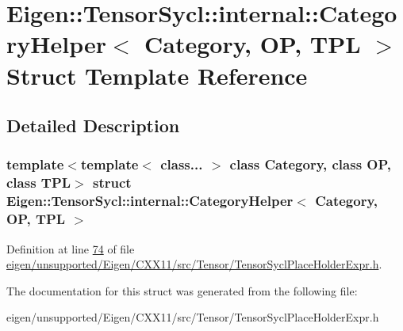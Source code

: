 \hypertarget{struct_eigen_1_1_tensor_sycl_1_1internal_1_1_category_helper}{}\section{Eigen\+:\+:Tensor\+Sycl\+:\+:internal\+:\+:Category\+Helper$<$ Category, OP, T\+PL $>$ Struct Template Reference}
\label{struct_eigen_1_1_tensor_sycl_1_1internal_1_1_category_helper}


\subsection{Detailed Description}
\subsubsection*{template$<$template$<$ class... $>$ class Category, class OP, class T\+PL$>$\newline
struct Eigen\+::\+Tensor\+Sycl\+::internal\+::\+Category\+Helper$<$ Category, O\+P, T\+P\+L $>$}



Definition at line \hyperlink{eigen_2unsupported_2_eigen_2_c_x_x11_2src_2_tensor_2_tensor_sycl_place_holder_expr_8h_source_l00074}{74} of file \hyperlink{eigen_2unsupported_2_eigen_2_c_x_x11_2src_2_tensor_2_tensor_sycl_place_holder_expr_8h_source}{eigen/unsupported/\+Eigen/\+C\+X\+X11/src/\+Tensor/\+Tensor\+Sycl\+Place\+Holder\+Expr.\+h}.



The documentation for this struct was generated from the following file\+:\begin{DoxyCompactItemize}
\item 
eigen/unsupported/\+Eigen/\+C\+X\+X11/src/\+Tensor/\+Tensor\+Sycl\+Place\+Holder\+Expr.\+h\end{DoxyCompactItemize}

